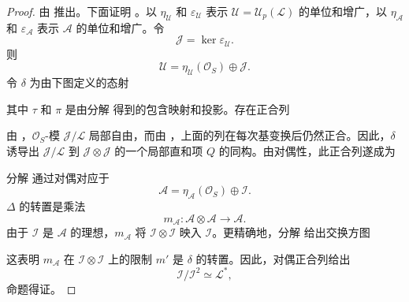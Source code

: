 \begin{proof}
 由  推出。下面证明 。以 \(\eta_{\mathcal U}\) 和 \(\varepsilon_{\mathcal U}\) 表示 \(\mathcal U=\mathcal U_p(\mathcal L)\) 的单位和增广，以 \(\eta_{\mathcal A}\) 和 \(\varepsilon_{\mathcal A}\) 表示 \(\mathcal A\) 的单位和增广。令
\[
  \mathcal J=\ker\varepsilon_{\mathcal U}.
\]
则
\begin{equation}
  \tag{1}\label{sga3:vii:proposition:5-5-3:equation:1}
  \mathcal U
  =
  \eta_{\mathcal U}(\mathcal O_S)\oplus\mathcal J.
\end{equation}
令 \(\delta\) 为由下图定义的态射
\begin{center}
  \label{sga3:VIIA:5.5.3-augmentation-kernel-delta-square}
  
\end{center}
其中 \(\tau\) 和 \(\pi\) 是由分解  得到的包含映射和投影。存在正合列
\begin{center}
  \label{sga3:VIIA:5.5.3-primitive-exact-sequence}
  
\end{center}

由 ，\(\mathcal O_S\)-模 \(\mathcal J/\mathcal L\) 局部自由，而由 ，上面的列在每次基变换后仍然正合。因此，\(\delta\) 诱导出 \(\mathcal J/\mathcal L\) 到 \(\mathcal J\otimes\mathcal J\) 的一个局部直和项 \(Q\) 的同构。由对偶性，此正合列遂成为
\begin{center}
  \label{sga3:VIIA:5.5.3-dual-exact-sequence}
  
\end{center}

分解  通过对偶对应于
\begin{equation}
  \tag{2}\label{sga3:vii:proposition:5-5-3:equation:2}
  \mathcal A
  =
  \eta_{\mathcal A}(\mathcal O_S)\oplus\mathcal I.
\end{equation}
\(\Delta\) 的转置是乘法
\[
  m_{\mathcal A}:
  \mathcal A\otimes\mathcal A
  \longrightarrow
  \mathcal A.
\]
由于 \(\mathcal I\) 是 \(\mathcal A\) 的理想，\(m_{\mathcal A}\) 将 \(\mathcal I\otimes\mathcal I\) 映入 \(\mathcal I\)。更精确地，分解  给出交换方图
\begin{center}
  \label{sga3:VIIA:5.5.3-augmentation-ideal-multiplication-square}
  
\end{center}
这表明 \(m_{\mathcal A}\) 在 \(\mathcal I\otimes\mathcal I\) 上的限制 \(m'\) 是 \(\delta\) 的转置。因此，对偶正合列给出
\[
  \mathcal I/\mathcal I^2
  \simeq
  \mathcal L^{*},
\]
命题得证。
\end{proof}

